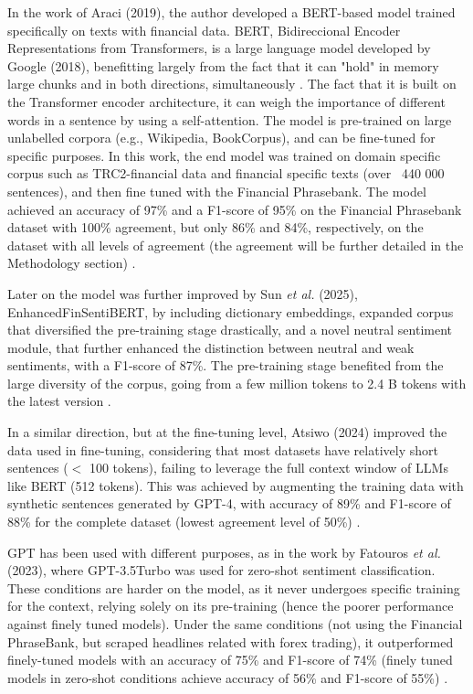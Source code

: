 \documentclass[conference]{IEEEtran}
\begin{document}
In the work of Araci (2019), the author developed a BERT-based model trained specifically on texts with financial data. BERT, Bidireccional Encoder Representations from Transformers, is a large language model developed by Google (2018), benefitting largely from the fact that it can "hold" in memory large chunks and in both directions, simultaneously \cite{devlin2019bert}. The fact that it is built on the Transformer encoder architecture, it can weigh the importance of different words in a sentence by using a self-attention. The model is pre-trained  on large unlabelled corpora (e.g., Wikipedia, BookCorpus), and can be fine-tuned for specific purposes. In this work, the end model was trained on  domain specific corpus such as TRC2-financial data and financial specific texts (over ~440 000 sentences), and then fine tuned with the Financial Phrasebank. The model achieved an accuracy of 97\% and a F1-score of 95\% on the Financial Phrasebank dataset with 100\% agreement, but only 86\% and 84\%, respectively, on the dataset with all levels of agreement (the agreement will be further detailed in the Methodology section) \cite{araci2019finbert}. 

Later on the model was further improved by Sun \textit{et al.} (2025), EnhancedFinSentiBERT, by including dictionary embeddings, expanded corpus that diversified the pre-training stage drastically, and a novel neutral sentiment module, that further enhanced the distinction between neutral and weak sentiments, with a F1-score of 87\%. The pre-training stage benefited from the large diversity of the corpus, going from a few million tokens to 2.4 B tokens with the latest version \cite{sun2025financial}.

In a similar direction, but at the fine-tuning level, Atsiwo (2024) improved the data used in fine-tuning, considering that most datasets have relatively short sentences ($<$ 100 tokens), failing to leverage the full context window  of LLMs like BERT (512 tokens). This was achieved by augmenting  the training data with synthetic sentences generated by GPT-4, with accuracy of 89\% and F1-score of 88\% for the complete dataset (lowest agreement level of 50\%) \cite{atsiwo2024financial}. 

GPT has been used with different purposes, as in the work by Fatouros \textit{et al.} (2023), where GPT-3.5Turbo was used for zero-shot sentiment classification. These conditions are harder on the model, as it never undergoes specific training for the context, relying solely on its pre-training (hence the poorer performance against finely tuned models). Under the same conditions (not using the Financial PhraseBank, but scraped headlines related with forex trading), it outperformed finely-tuned models with an accuracy of 75\% and F1-score of 74\% (finely tuned models in zero-shot conditions achieve accuracy of 56\% and F1-score of 55\%) \cite{fatouros2023chatgpt}.
\end{document}
